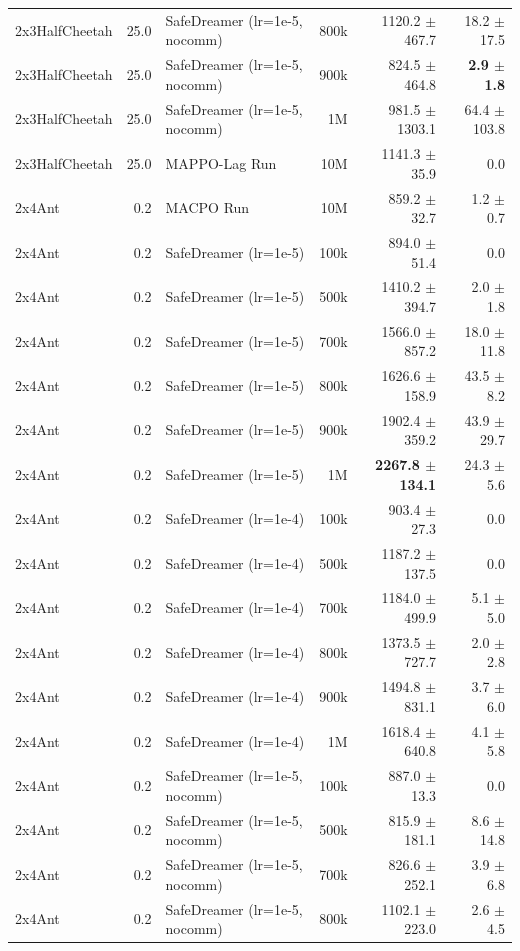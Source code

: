 \begin{longtable}{l r l r r r}
2x3HalfCheetah & 25.0 & SafeDreamer (lr=1e-5, nocomm) & 800k & 1120.2 $\pm$ 467.7 & 18.2 $\pm$ 17.5 \\
2x3HalfCheetah & 25.0 & SafeDreamer (lr=1e-5, nocomm) & 900k & 824.5 $\pm$ 464.8 & \textbf{2.9 $\pm$ 1.8} \\
2x3HalfCheetah & 25.0 & SafeDreamer (lr=1e-5, nocomm) & 1M & 981.5 $\pm$ 1303.1 & 64.4 $\pm$ 103.8 \\
2x3HalfCheetah & 25.0 & MAPPO-Lag Run & 10M & 1141.3 $\pm$ 35.9 & 0.0 \\
\midrule
2x4Ant & 0.2 & MACPO Run & 10M & 859.2 $\pm$ 32.7 & 1.2 $\pm$ 0.7 \\
2x4Ant & 0.2 & SafeDreamer (lr=1e-5) & 100k & 894.0 $\pm$ 51.4 & 0.0 \\
2x4Ant & 0.2 & SafeDreamer (lr=1e-5) & 500k & 1410.2 $\pm$ 394.7 & 2.0 $\pm$ 1.8 \\
2x4Ant & 0.2 & SafeDreamer (lr=1e-5) & 700k & 1566.0 $\pm$ 857.2 & 18.0 $\pm$ 11.8 \\
2x4Ant & 0.2 & SafeDreamer (lr=1e-5) & 800k & 1626.6 $\pm$ 158.9 & 43.5 $\pm$ 8.2 \\
2x4Ant & 0.2 & SafeDreamer (lr=1e-5) & 900k & 1902.4 $\pm$ 359.2 & 43.9 $\pm$ 29.7 \\
2x4Ant & 0.2 & SafeDreamer (lr=1e-5) & 1M & \textbf{2267.8 $\pm$ 134.1} & 24.3 $\pm$ 5.6 \\
2x4Ant & 0.2 & SafeDreamer (lr=1e-4) & 100k & 903.4 $\pm$ 27.3 & 0.0 \\
2x4Ant & 0.2 & SafeDreamer (lr=1e-4) & 500k & 1187.2 $\pm$ 137.5 & 0.0 \\
2x4Ant & 0.2 & SafeDreamer (lr=1e-4) & 700k & 1184.0 $\pm$ 499.9 & 5.1 $\pm$ 5.0 \\
2x4Ant & 0.2 & SafeDreamer (lr=1e-4) & 800k & 1373.5 $\pm$ 727.7 & 2.0 $\pm$ 2.8 \\
2x4Ant & 0.2 & SafeDreamer (lr=1e-4) & 900k & 1494.8 $\pm$ 831.1 & 3.7 $\pm$ 6.0 \\
2x4Ant & 0.2 & SafeDreamer (lr=1e-4) & 1M & 1618.4 $\pm$ 640.8 & 4.1 $\pm$ 5.8 \\
2x4Ant & 0.2 & SafeDreamer (lr=1e-5, nocomm) & 100k & 887.0 $\pm$ 13.3 & 0.0 \\
2x4Ant & 0.2 & SafeDreamer (lr=1e-5, nocomm) & 500k & 815.9 $\pm$ 181.1 & 8.6 $\pm$ 14.8 \\
2x4Ant & 0.2 & SafeDreamer (lr=1e-5, nocomm) & 700k & 826.6 $\pm$ 252.1 & 3.9 $\pm$ 6.8 \\
2x4Ant & 0.2 & SafeDreamer (lr=1e-5, nocomm) & 800k & 1102.1 $\pm$ 223.0 & 2.6 $\pm$ 4.5 \\

\end{longtable}
